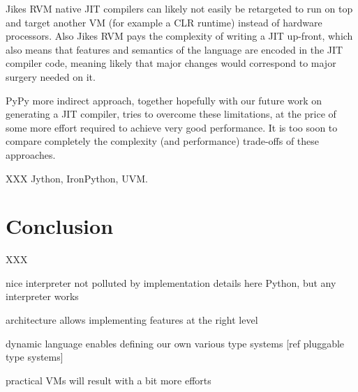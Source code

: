 \documentclass{acm_proc_article-sp}
\begin{document}
Jikes RVM native JIT compilers can likely not easily be retargeted to
run on top and target another VM (for example a CLR runtime) instead
of hardware processors. Also Jikes RVM pays the complexity of writing
a JIT up-front, which also means that features and semantics of the
language are encoded in the JIT compiler code, meaning likely that
major changes would correspond to major surgery needed on it.

PyPy more indirect approach, together hopefully with our future work
on generating a JIT compiler, tries to overcome these limitations, at
the price of some more effort required to achieve very good
performance. It is too soon to compare completely the complexity (and
performance) trade-offs of these approaches.


XXX Jython, IronPython, UVM.

\section{Conclusion}
\label{conclusion}


XXX

nice interpreter not polluted by implementation details
here Python, but any interpreter works

architecture allows implementing features at the right level

dynamic language enables defining our own various type systems
[ref pluggable type systems]

practical VMs will result with a bit more efforts
\end{document}
